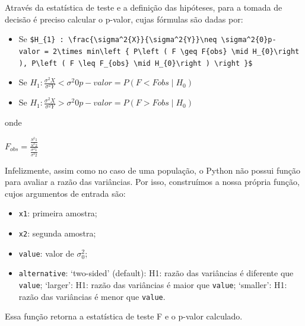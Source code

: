 \documentclass[
  letterpaper,
  DIV=11,
  numbers=noendperiod]{scrreprt}
\providecommand{\tightlist}{%
  \setlength{\itemsep}{0pt}\setlength{\parskip}{0pt}}\usepackage{longtable,booktabs,array}
\begin{document}
Através da estatística de teste e a definição das hipóteses, para a
tomada de decisão é preciso calcular o p-valor, cujas fórmulas são dadas
por:

\begin{itemize}
\item
  Se
  \texttt{\$H\_\{1\}\ :\ \textbackslash{}frac\{\textbackslash{}sigma\^{}2\{X\}\}\{\textbackslash{}sigma\^{}2\{Y\}\}\textbackslash{}neq\ \textbackslash{}sigma\^{}2\{0\}p-valor\ =\ 2\textbackslash{}times\ min\textbackslash{}left\ \{\ P\textbackslash{}left\ (\ F\ \textbackslash{}geq\ F\{obs\}\ \textbackslash{}mid\ H\_\{0\}\textbackslash{}right\ ),\ P\textbackslash{}left\ (\ F\ \textbackslash{}leq\ F\_\{obs\}\ \textbackslash{}mid\ H\_\{0\}\textbackslash{}right\ )\ \textbackslash{}right\ \}\$}
\item
  Se
  \(H_{1} : \frac{\sigma^2{X}}{\sigma^2{Y}}< \sigma^2{0}p-valor = P\left ( F < F{obs}\mid H_{0} \right )\)
\item
  Se
  \(H_{1} : \frac{\sigma^2{X}}{\sigma^2{Y}}> \sigma^2{0}p-valor = P\left ( F > F{obs} \mid H_{0}\right )\)
\end{itemize}

onde

\(F_{obs} = \frac{\frac{S^{2}{1}}{S^{2}{2}}}{\frac{\sigma^{2}{1}}{\sigma ^{2}{2}}}\)

Infelizmente, assim como no caso de uma população, o Python não possui
função para avaliar a razão das variâncias. Por isso, construímos a
nossa própria função, cujos argumentos de entrada são:

\begin{itemize}
\tightlist
\item
  \texttt{x1}: primeira amostra;
\item
  \texttt{x2}: segunda amostra;
\item
  \texttt{value}: valor de \({\sigma^{2}_{0}}\);
\item
  \texttt{alternative}: `two-sided' (default): H1: razão das variâncias
  é diferente que \texttt{value}; `larger': H1: razão das variâncias é
  maior que \texttt{value}; `smaller': H1: razão das variâncias é menor
  que \texttt{value}.
\end{itemize}

Essa função retorna a estatística de teste F e o p-valor calculado.
\end{document}
